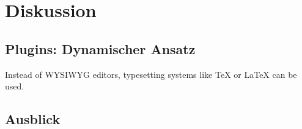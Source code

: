 \chapter{Diskussion}
\section{Plugins: Dynamischer Ansatz}
Instead of WYSIWYG editors, typesetting systems like \TeX{} or \LaTeX{} \cite{lamport94} can be used.
\section{Ausblick}
